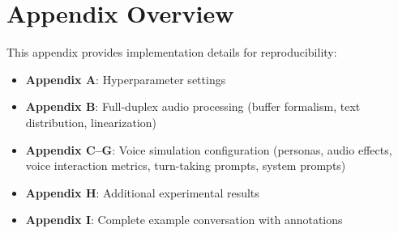 
\section*{Appendix Overview}
This appendix provides implementation details for reproducibility:
\begin{itemize}
    \item \textbf{Appendix A}: Hyperparameter settings
    \item \textbf{Appendix B}: Full-duplex audio processing (buffer formalism, text distribution, linearization)
    \item \textbf{Appendix C--G}: Voice simulation configuration (personas, audio effects, voice interaction metrics, turn-taking prompts, system prompts)
    \item \textbf{Appendix H}: Additional experimental results
    \item \textbf{Appendix I}: Complete example conversation with annotations
\end{itemize}













